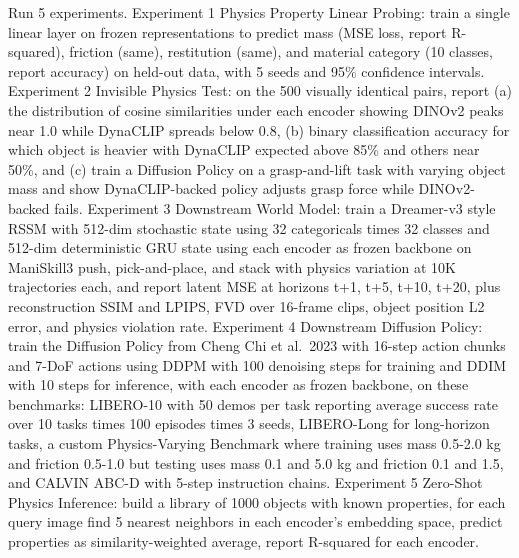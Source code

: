 \documentclass[11pt,a4paper]{article}
\begin{document}
Run 5 experiments. Experiment 1 Physics Property Linear Probing: train a single linear layer on frozen representations to predict mass (MSE loss, report R-squared), friction (same), restitution (same), and material category (10 classes, report accuracy) on held-out data, with 5 seeds and 95\% confidence intervals. Experiment 2 Invisible Physics Test: on the 500 visually identical pairs, report (a) the distribution of cosine similarities under each encoder showing DINOv2 peaks near 1.0 while DynaCLIP spreads below 0.8, (b) binary classification accuracy for which object is heavier with DynaCLIP expected above 85\% and others near 50\%, and (c) train a Diffusion Policy on a grasp-and-lift task with varying object mass and show DynaCLIP-backed policy adjusts grasp force while DINOv2-backed fails. Experiment 3 Downstream World Model: train a Dreamer-v3 style RSSM with 512-dim stochastic state using 32 categoricals times 32 classes and 512-dim deterministic GRU state using each encoder as frozen backbone on ManiSkill3 push, pick-and-place, and stack with physics variation at 10K trajectories each, and report latent MSE at horizons t+1, t+5, t+10, t+20, plus reconstruction SSIM and LPIPS, FVD over 16-frame clips, object position L2 error, and physics violation rate. Experiment 4 Downstream Diffusion Policy: train the Diffusion Policy from Cheng Chi et al.\ 2023 with 16-step action chunks and 7-DoF actions using DDPM with 100 denoising steps for training and DDIM with 10 steps for inference, with each encoder as frozen backbone, on these benchmarks: LIBERO-10 with 50 demos per task reporting average success rate over 10 tasks times 100 episodes times 3 seeds, LIBERO-Long for long-horizon tasks, a custom Physics-Varying Benchmark where training uses mass 0.5-2.0 kg and friction 0.5-1.0 but testing uses mass 0.1 and 5.0 kg and friction 0.1 and 1.5, and CALVIN ABC-D with 5-step instruction chains. Experiment 5 Zero-Shot Physics Inference: build a library of 1000 objects with known properties, for each query image find 5 nearest neighbors in each encoder's embedding space, predict properties as similarity-weighted average, report R-squared for each encoder.
\end{document}
